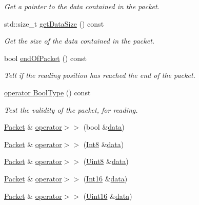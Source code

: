 \begin{DoxyCompactItemize}
\begin{DoxyCompactList}\small\item\em Get a pointer to the data contained in the packet. \end{DoxyCompactList}\item 
std\-::size\-\_\-t \hyperlink{classsf_1_1_packet_a004b62aa5bafa69df8917171a3fe1fa0}{get\-Data\-Size} () const 
\begin{DoxyCompactList}\small\item\em Get the size of the data contained in the packet. \end{DoxyCompactList}\item 
bool \hyperlink{classsf_1_1_packet_aee3adfca6303f1e6bde3c62be392b945}{end\-Of\-Packet} () const 
\begin{DoxyCompactList}\small\item\em Tell if the reading position has reached the end of the packet. \end{DoxyCompactList}\item 
\hyperlink{classsf_1_1_packet_addcb990cde37859c748273d9de55e628}{operator Bool\-Type} () const 
\begin{DoxyCompactList}\small\item\em Test the validity of the packet, for reading. \end{DoxyCompactList}\item 
\hyperlink{classsf_1_1_packet}{Packet} \& \hyperlink{classsf_1_1_packet_af8e26c63ba9bdccd262565ff0d3eeba2}{operator$>$$>$} (bool \&\hyperlink{gl3_8h_a0f78eecb0891cce3bdfc815b971866a1}{data})
\item 
\hyperlink{classsf_1_1_packet}{Packet} \& \hyperlink{classsf_1_1_packet_a70fd5abb9095b5335b79c0cefd17b222}{operator$>$$>$} (\hyperlink{namespacesf_a69b109973eac74e22b97e5339bdb68dd}{Int8} \&\hyperlink{gl3_8h_a0f78eecb0891cce3bdfc815b971866a1}{data})
\item 
\hyperlink{classsf_1_1_packet}{Packet} \& \hyperlink{classsf_1_1_packet_aa67738284a7efc16c7594b358ef35510}{operator$>$$>$} (\hyperlink{namespacesf_a4ef3d630785c4f296f9b4f274c33d78e}{Uint8} \&\hyperlink{gl3_8h_a0f78eecb0891cce3bdfc815b971866a1}{data})
\item 
\hyperlink{classsf_1_1_packet}{Packet} \& \hyperlink{classsf_1_1_packet_af82d6c4e6d74f2ca39732c1e29f30781}{operator$>$$>$} (\hyperlink{namespacesf_a3c8e10435e2a310a7741755e66b5c94e}{Int16} \&\hyperlink{gl3_8h_a0f78eecb0891cce3bdfc815b971866a1}{data})
\item 
\hyperlink{classsf_1_1_packet}{Packet} \& \hyperlink{classsf_1_1_packet_afd8706f092bc830ebb438aeee9271647}{operator$>$$>$} (\hyperlink{namespacesf_a2fcaf787248b0b83dfb6b145ca348246}{Uint16} \&\hyperlink{gl3_8h_a0f78eecb0891cce3bdfc815b971866a1}{data})

\end{DoxyCompactItemize}

